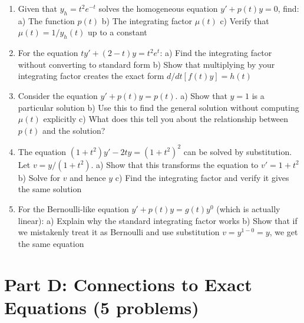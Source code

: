 \documentclass[12pt]{article}
\begin{document}
\begin{enumerate}[resume]
\item Given that $y_h = t^2e^{-t}$ solves the homogeneous equation $y' + p(t)y = 0$, find:
   a) The function $p(t)$
   b) The integrating factor $\mu(t)$
   c) Verify that $\mu(t) = 1/y_h(t)$ up to a constant

\item For the equation $ty' + (2-t)y = t^2e^t$:
   a) Find the integrating factor without converting to standard form
   b) Show that multiplying by your integrating factor creates the exact form $d/dt[f(t)y] = h(t)$

\item Consider the equation $y' + p(t)y = p(t)$.
   a) Show that $y = 1$ is a particular solution
   b) Use this to find the general solution without computing $\mu(t)$ explicitly
   c) What does this tell you about the relationship between $p(t)$ and the solution?

\item The equation $(1 + t^2)y' - 2ty = (1 + t^2)^2$ can be solved by substitution. Let $v = y/(1+t^2)$.
   a) Show that this transforms the equation to $v' = 1 + t^2$
   b) Solve for $v$ and hence $y$
   c) Find the integrating factor and verify it gives the same solution

\item For the Bernoulli-like equation $y' + p(t)y = g(t)y^0$ (which is actually linear):
   a) Explain why the standard integrating factor works
   b) Show that if we mistakenly treat it as Bernoulli and use substitution $v = y^{1-0} = y$, we get the same equation
\end{enumerate}

\section*{Part D: Connections to Exact Equations (5 problems)}
\end{document}

